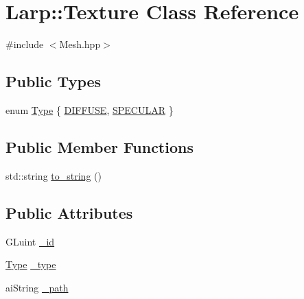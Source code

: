 \hypertarget{classLarp_1_1Texture}{\section{Larp\-:\-:Texture Class Reference}
\label{classLarp_1_1Texture}
}


{\ttfamily \#include $<$Mesh.\-hpp$>$}

\subsection*{Public Types}
\begin{DoxyCompactItemize}
\item 
enum \hyperlink{classLarp_1_1Texture_aa4e19b5df6a8f1f0eae8235db7e52daa}{Type} \{ \hyperlink{classLarp_1_1Texture_aa4e19b5df6a8f1f0eae8235db7e52daaa99b3b29878c69b4fc932de604ce39581}{D\-I\-F\-F\-U\-S\-E}, 
\hyperlink{classLarp_1_1Texture_aa4e19b5df6a8f1f0eae8235db7e52daaa5d8421e01e03aeb7f2911890a0a138b4}{S\-P\-E\-C\-U\-L\-A\-R}
 \}
\end{DoxyCompactItemize}
\subsection*{Public Member Functions}
\begin{DoxyCompactItemize}
\item 
std\-::string \hyperlink{classLarp_1_1Texture_aa5ab3d71dc56dafc3e4620bfaf4e619b}{to\-\_\-string} ()
\end{DoxyCompactItemize}
\subsection*{Public Attributes}
\begin{DoxyCompactItemize}
\item 
G\-Luint \hyperlink{classLarp_1_1Texture_a123213a957b3d3ca92ea5439c12a1097}{\-\_\-id}
\item 
\hyperlink{classLarp_1_1Texture_aa4e19b5df6a8f1f0eae8235db7e52daa}{Type} \hyperlink{classLarp_1_1Texture_a5db004a6f9355d7c055bbf036b5bc2f4}{\-\_\-type}
\item 
ai\-String \hyperlink{classLarp_1_1Texture_aed77d19ec08af05131aa054df2f937b9}{\-\_\-path}
\end{DoxyCompactItemize}


